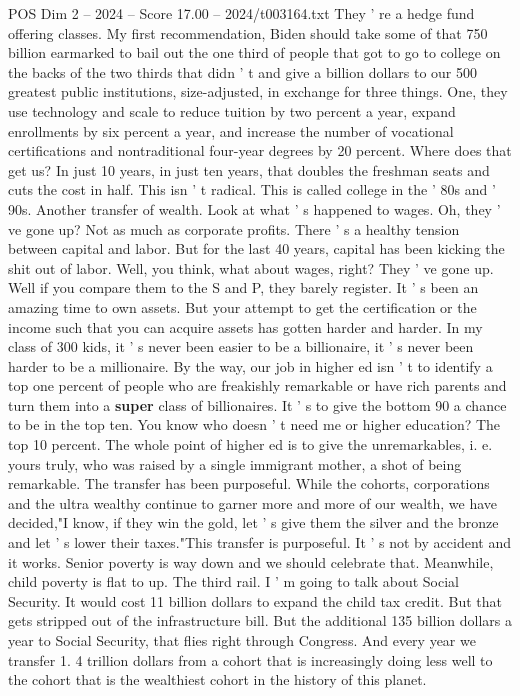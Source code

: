 \begin{textsample}{POS Dim 2 – 2024 – Score 17.00 – 2024/t003164.txt}
They ' re a hedge fund offering classes.
My first recommendation, Biden should take some of that 750 billion earmarked to bail out the one third of people that got to go to college on the backs of the two thirds that didn ' t and give a billion dollars to our 500 greatest public institutions, size-adjusted, in exchange for three things.
One, they use technology and scale to reduce tuition by two percent a year, expand enrollments by six percent a year, and increase the number of vocational certifications and nontraditional four-year degrees by 20 percent.
Where does that get us?
In just 10 years, in just ten years, that doubles the freshman seats and cuts the cost in half.
This isn ' t radical.
This is called college in the ' 80s and ' 90s.
Another transfer of wealth.
Look at what ' s happened to wages.
Oh, they ' ve gone up?
Not as much as corporate profits.
There ' s a healthy tension between capital and labor.
But for the last 40 years, capital has been kicking the shit out of labor.
Well, you think, what about wages, right?
They ' ve gone up.
Well if you compare them to the S and P, they barely register.
It ' s been an amazing time to own assets.
But your attempt to get the certification or the income such that you can acquire assets has gotten harder and harder.
In my class of 300 kids, it ' s never been easier to be a billionaire, it ' s never been harder to be a millionaire.
By the way, our job in higher ed isn ' t to identify a top one percent of people who are freakishly remarkable or have rich parents and turn them into a \textbf{super} class of billionaires.
It ' s to give the bottom 90 a chance to be in the top ten.
You know who doesn ' t need me or higher education?
The top 10 percent.
The whole point of higher ed is to give the unremarkables, i. e. yours truly, who was raised by a single immigrant mother, a shot of being remarkable.
The transfer has been purposeful.
While the cohorts, corporations and the ultra wealthy continue to garner more and more of our wealth, we have decided,"I know, if they win the gold, let ' s give them the silver and the bronze and let ' s lower their taxes."This transfer is purposeful.
It ' s not by accident and it works.
Senior poverty is way down and we should celebrate that.
Meanwhile, child poverty is flat to up.
The third rail.
I ' m going to talk about Social Security.
It would cost 11 billion dollars to expand the child tax credit.
But that gets stripped out of the infrastructure bill.
But the additional 135 billion dollars a year to Social Security, that flies right through Congress.
And every year we transfer 1. 4 trillion dollars from a cohort that is increasingly doing less well to the cohort that is the wealthiest cohort in the history of this planet.

\end{textsample}
